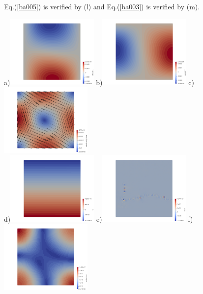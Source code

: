 Eq.(\ref{ba005}) is verified by (l) and Eq.(\ref{ba003}) is verified by (m).

\newpage
\begin{center}
a)\includegraphics[width=4.5cm]{python_codes/fieldstone_compressible2/EBA_104/u.png}
b)\includegraphics[width=4.5cm]{python_codes/fieldstone_compressible2/EBA_104/v.png}
c)\includegraphics[width=4.5cm]{python_codes/fieldstone_compressible2/EBA_104/vel.png}\\
d)\includegraphics[width=4.5cm]{python_codes/fieldstone_compressible2/EBA_104/q.png}    
e)\includegraphics[width=4.5cm]{python_codes/fieldstone_compressible2/EBA_104/divv.png}    
f)\includegraphics[width=4.5cm]{python_codes/fieldstone_compressible2/EBA_104/e2.png}   \\

\end{center}
